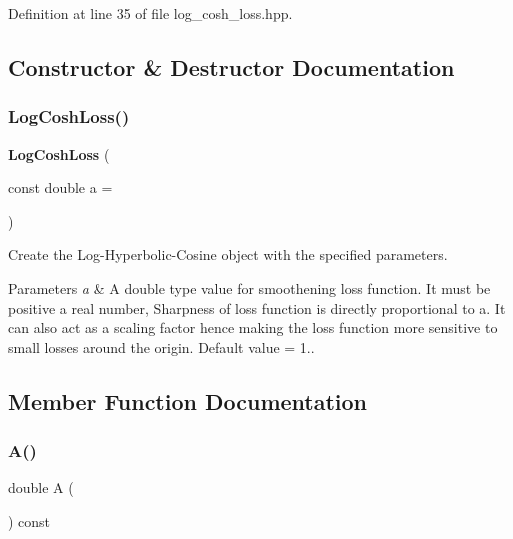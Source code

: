 Definition at line 35 of file log\+\_\+cosh\+\_\+loss.\+hpp.



\subsection{Constructor \& Destructor Documentation}
\mbox{\label{classmlpack_1_1ann_1_1LogCoshLoss_aa786489fcdc270dd947b12eb8709c064}} 
\subsubsection{Log\+Cosh\+Loss()}
{\footnotesize\ttfamily \textbf{ Log\+Cosh\+Loss} (\begin{DoxyParamCaption}\item[{const double}]{a = {} }\end{DoxyParamCaption})}



Create the Log-\/\+Hyperbolic-\/\+Cosine object with the specified parameters. 


\begin{DoxyParams}{Parameters}
{\em a} & A double type value for smoothening loss function. It must be positive a real number, Sharpness of loss function is directly proportional to a. It can also act as a scaling factor hence making the loss function more sensitive to small losses around the origin. Default value = 1.. \\
\hline
\end{DoxyParams}


\subsection{Member Function Documentation}
\mbox{\label{classmlpack_1_1ann_1_1LogCoshLoss_aab6c632054fc383ec1edf83231163bf7}} 
\subsubsection{A()\hspace{0.1cm}{\footnotesize\ttfamily [1/2]}}
{\footnotesize\ttfamily double A (\begin{DoxyParamCaption}{ }\end{DoxyParamCaption}) const\hspace{0.3cm}{\ttfamily [inline]}}



